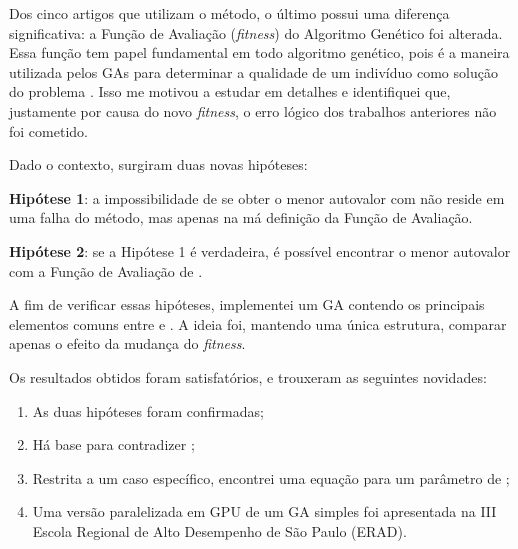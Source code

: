 	Dos cinco artigos que utilizam o método, o último \cite{metodo2011} possui uma diferença significativa: a Função de Avaliação (\emph{fitness}) do Algoritmo Genético foi alterada. Essa função tem papel fundamental em todo algoritmo genético, pois é a maneira utilizada pelos GAs para determinar a qualidade de um indivíduo como solução do problema \cite{Linden2008}. Isso me motivou a estudar \cite{metodo2011} em detalhes e identifiquei que, justamente por causa do novo \emph{fitness}, o erro lógico dos trabalhos anteriores não foi cometido.
	
	Dado o contexto, surgiram duas novas hipóteses:
	
	\textbf{Hipótese 1}: a impossibilidade de se obter o menor autovalor com \cite{metodo2004} não reside em uma falha do método, mas apenas na má definição da Função de Avaliação.
	
	\textbf{Hipótese 2}: se a Hipótese 1 é verdadeira, é possível encontrar o menor autovalor com a Função de Avaliação de \cite{metodo2011}.
		
	A fim de verificar essas hipóteses, implementei um GA contendo os principais elementos comuns entre \cite{metodo2004} e \cite{metodo2011}. A ideia foi, mantendo uma única estrutura, comparar apenas o efeito da mudança do \emph{fitness}.
	
	Os resultados obtidos foram satisfatórios, e trouxeram as seguintes novidades:
	
	\begin{enumerate}
		\item As duas hipóteses foram confirmadas;
		\item Há base para contradizer \cite{metodo2004};
		\item Restrita a um caso específico, encontrei uma equação para um parâmetro de \cite{metodo2011};
		\item Uma versão paralelizada em GPU de um GA simples foi apresentada na III Escola Regional de Alto Desempenho de São Paulo (ERAD).
	\end{enumerate}